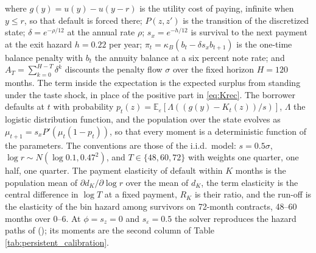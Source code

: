 where $g(y) = u(y) - u(y - r)$ is the utility cost of paying, infinite when $y \le r$, so that default is forced there; $P(z, z')$ is the transition of the discretized state; $\delta = e^{-\rho/12}$ at the annual rate $\rho$; $s_x = e^{-h/12}$ is survival to the next payment at the exit hazard $h = 0.22$ per year; $\pi_t = \kappa_B (b_t - \delta s_x b_{t+1})$ is the one-time balance penalty with $b_t$ the annuity balance at a six percent note rate; and $A_T = \sum_{k=0}^{H-T}\delta^k$ discounts the penalty flow $\sigma$ over the fixed horizon $H = 120$ months. The term inside the expectation is the expected surplus from standing under the taste shock, in place of the positive part in \eqref{eq:Krec}. The borrower defaults at $t$ with probability $p_t(z) = \mathbb{E}_\varepsilon[\Lambda((g(y) - K_t(z))/s)]$, $\Lambda$ the logistic distribution function, and the population over the state evolves as $\mu_{t+1} = s_x P'(\mu_t (1 - p_t))$, so that every moment is a deterministic function of the parameters. The conventions are those of the i.i.d.\ model: $s = 0.5\sigma$, $\log r \sim N(\log 0.1, 0.47^2)$, and $T \in \{48, 60, 72\}$ with weights one quarter, one half, one quarter. The payment elasticity of default within $K$ months is the population mean of $\partial d_K/\partial \log r$ over the mean of $d_K$, the term elasticity is the central difference in $\log T$ at a fixed payment, $R_K$ is their ratio, and the run-off is the elasticity of the bin hazard among survivors on 72-month contracts, 48--60 months over 0--6. At $\phi = s_z = 0$ and $s_\varepsilon = 0.5$ the solver reproduces the hazard paths of  (); its moments are the second column of Table \ref{tab:persistent_calibration}.

